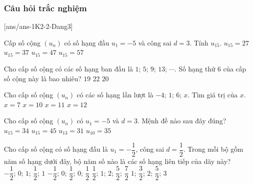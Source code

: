 \subsubsection{Câu hỏi trắc nghiệm}
[ans/ans-1K2-2-Dang3]
\begin{ex}%
	Cấp số cộng $(u_n)$ có số hạng đầu $u_1=-5$ và công sai $d=3$. Tính $u_{15}$.
	\choice
	{$u_{15}=27$}
	{\True $u_{15}=37$}
	{$u_{15}=47$}
	{$u_{15}=57$}
\end{ex}

\begin{ex}%
	Cho cấp số cộng có các số hạng ban đầu là $1$; $5$; $9$; $13$; $\cdots$. Số hạng thứ $ 6 $ của cấp số cộng này là bao nhiêu?
	{$19 $}
	{$ 22$}
	{$ 20$}
\end{ex}

\begin{ex}%
	Cho cấp số cộng $\left( u_n \right)$ có các số hạng lần lượt là $-4;\,1;\,6;\,x$. Tìm giá trị của $x$.
	\choice
	{$x=7$}
	{$x=10$}
	{\True $x=11$}
	{$x=12$}
\end{ex}

\begin{ex}%
	Cho cấp số cộng $(u_n)$ có $u_1=-5$ và $d=3$. Mệnh đề nào sau đây đúng?
	\choice
	{$u_{15}=34$}
	{$u_{15}=45$}
	{\True $u_{13}=31$}
	{$u_{10}=35$}
\end{ex}

\begin{ex}%
	Cho cấp số cộng có số hạng đầu là $u_1=-\dfrac{1}{2}$, công sai $d=\dfrac{1}{2}$. Trong mỗi bộ gồm năm số hạng dưới đây, bộ năm số nào là các số hạng liên tiếp của dãy này?
	\choice
	{$-\dfrac{1}{2};\,0;\,1;\,\dfrac{1}{2};\,1$}
	{$-\dfrac{1}{2};\,0;\,\dfrac{1}{2};\,0;\,\dfrac{1}{2}$}
	{$\dfrac{1}{2};\,1;\,2;\,\dfrac{5}{2};\,\dfrac{7}{2}$}
	{\True $1;\,\dfrac{3}{2};\,2;\,\dfrac{5}{2};\,3$}
\end{ex}

